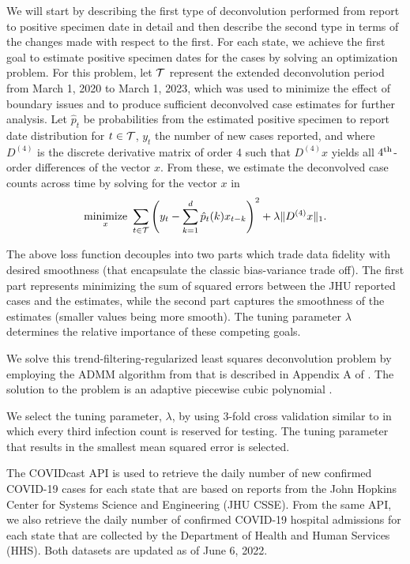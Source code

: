 \documentclass{article}
\begin{document}
We will start by describing the first type of deconvolution performed from
report to positive specimen date in detail and then describe the second type in
terms of the changes made with respect to the first. For each state, we achieve
the first goal to estimate positive specimen dates for the cases by solving an
optimization problem. 
For this problem, let $\mathcal{T}$ represent the extended deconvolution period from
March 1, 2020 to March 1, 2023, which was used to minimize the effect of
boundary issues and to produce sufficient deconvolved case estimates for further
analysis. Let $\hat{p}_t$ be probabilities from the estimated positive specimen
to report date distribution for $t \in \mathcal{T}$, $y_t$ the number of new cases
reported, and where $D^{(4)}$ is the discrete derivative matrix of order 4 such
that $D^{(4)}x$ yields all $4^{\textnormal{th}}$-order differences of the vector $x$. From
these, we estimate the deconvolved case counts across time by solving for the
vector $x$ in
\begin{align*}
\operatorname*{minimize}_{x}\ \sum_{t \in \mathcal{T}} \left ( y_t -  \sum_{k = 1}^{d} \hat{p}_t(k)x_{t-k} 
\right )^2 + \lambda \|D^{(4)}x\|_1. 
\end{align*}

The above loss function decouples into two parts which trade data fidelity with
desired smoothness (that
encapsulate the classic bias-variance trade off). The first part represents
minimizing the sum of squared errors between the JHU reported cases and the
estimates, while the second part captures the smoothness of the estimates
(smaller values being more smooth). The tuning parameter $\lambda$ determines
the relative importance of these competing goals.

We solve this trend-filtering-regularized least squares deconvolution problem by
employing the ADMM algorithm from \citet{ramdas2016fast} that is described in
Appendix A of \citet{jahja2022real}. The solution to the problem is an adaptive
piecewise cubic polynomial \citep{tibshirani2014adaptive,
tibshirani2022divided}.

We select the tuning parameter, $\lambda$, by using $3$-fold cross validation
similar to \citet{jahja2022real} in which every third infection count is
reserved for testing. The tuning parameter that results in the smallest mean
squared error is selected.

The COVIDcast API \citep{reinhart2021open} is used to retrieve the daily number
of new confirmed COVID-19 cases for each state that are based on reports from
the John Hopkins Center for Systems Science and Engineering (JHU
CSSE)\citealp{dong2020interactive}. From the same API, we also retrieve the
daily number of confirmed COVID-19 hospital admissions for each state that are
collected by the \US Department of Health and Human Services (HHS). Both
datasets are updated as of June 6, 2022.
\end{document}
